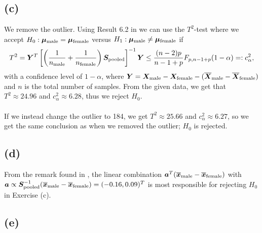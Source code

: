 \subsection*{(c)}
\label{sec:c-1}
We remove the outlier.
 Using Result 6.2 in \cite[p. 286]{book} we can use the $T^{2}$-test
 where we accept $H_{0}:\bm{\mu}_{\rm male} = \bm{\mu}_{\rm female}$ versus
 $H_{1}:\bm{\mu}_{\rm male} \neq \bm{\mu}_{\rm female}$ if 
\begin{equation*}
T^{2} = \bm{Y}^{T}
\left[
  \left(
    \frac{1}{n_{\rm male}} + \frac{1}{n_{\rm female}}
  \right)
  \bm{S}_{\rm pooled}
\right]^{-1} \bm{Y}
\leq \frac{(n-2)p}{n-1+p}F_{p, n-1+p}(1-\alpha) =:c^{2}_{\alpha},
\end{equation*}
with a confidence level of $1-\alpha$, where $\bm{Y} = \bm{X}_{\rm male}- \bm{X}_{\rm female} - (\overline{\bm{X}}_{\rm male}- \overline{\bm{X}}_{\rm female} )$ and $n$ is the total number of samples. From the given data, we get that
 $T^{2}\approx 24.96 $
and $c^{2}_{\alpha} \approx 6.28$, thus we reject $H_{0}$. \\
\\
If we instead change the outlier to 184, we get $T^{2} \approx 25.66$ and
$c_{\alpha}^{2} \approx  6.27$, so we get the same conclusion as when
we removed the outlier; $H_{0}$ is rejected.
\subsection*{(d)}
 From the remark found in \cite[p. 289]{book}, the linear combination
 $\bm{a}^{T} (\overline{\bm{x}}_{\rm male} - \overline{\bm{x}}_{\rm female})$ with $\bm{a}
 \propto \bm{S}_{\rm pooled}^{-1}(\overline{\bm{x}}_{\rm male} - \overline{\bm{x}}_{\rm
   female}) =
 (   -0.16, 0.09)^{T}
$ is most responsible for rejecting $H_{0}$ in Exercise (c). 
\subsection*{(e)}
\label{sec:e}

